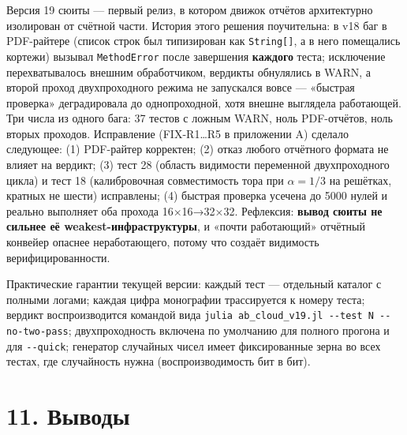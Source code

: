 \documentclass[
]{article}
\begin{document}
Версия 19 сюиты --- первый релиз, в котором движок отчётов архитектурно
изолирован от счётной части. История этого решения поучительна: в v18
баг в PDF-райтере (список строк был типизирован как
\texttt{String{[}{]}}, а в него помещались кортежи) вызывал
\texttt{MethodError} после завершения \textbf{каждого} теста; исключение
перехватывалось внешним обработчиком, вердикты обнулялись в WARN, а
второй проход двухпроходного режима не запускался вовсе --- «быстрая
проверка» деградировала до однопроходной, хотя внешне выглядела
работающей. Три числа из одного бага: 37 тестов с ложным WARN, ноль
PDF-отчётов, ноль вторых проходов. Исправление (FIX-R1\ldots R5 в
приложении A) сделало следующее: (1) PDF-райтер корректен; (2) отказ
любого отчётного формата не влияет на вердикт; (3) тест 28 (область
видимости переменной двухпроходного цикла) и тест 18 (калибровочная
совместимость тора при \(\alpha=1/3\) на решётках, кратных не шести)
исправлены; (4) быстрая проверка усечена до 5000 нулей и реально
выполняет оба прохода 16×16→32×32. Рефлексия: \textbf{вывод сюиты не
сильнее её weakest-инфраструктуры}, и «почти работающий» отчётный
конвейер опаснее неработающего, потому что создаёт видимость
верифицированности.

Практические гарантии текущей версии: каждый тест --- отдельный каталог
с полными логами; каждая цифра монографии трассируется к номеру теста;
вердикт воспроизводится командой вида
\texttt{julia\ ab\_cloud\_v19.jl\ -\/-test\ N\ -\/-no-two-pass};
двухпроходность включена по умолчанию для полного прогона и для
\texttt{-\/-quick}; генератор случайных чисел имеет фиксированные зерна
во всех тестах, где случайность нужна (воспроизводимость бит в бит).

\section{11. Выводы}\label{ux432ux44bux432ux43eux434ux44b}
\end{document}
